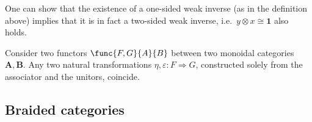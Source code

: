     \begin{remark}
        One can show that the existence of a one-sided weak inverse (as in the definition above) implies that it is in fact a two-sided weak inverse, i.e.~$y\otimes x\cong\mathbf{1}$ also holds.
    \end{remark}

    \begin{theorem}
        Consider two functors $\func{F,G}{A}{B}$ between two monoidal categories $\mathbf{A},\mathbf{B}$. Any two natural transformations $\eta,\varepsilon:F\Rightarrow G$, constructed solely from the associator and the unitors, coincide.
    \end{theorem}

\subsection{Braided categories}

